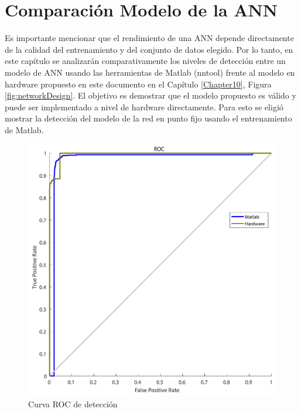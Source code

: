 
\chapter{Comparación Modelo de la ANN} %
\label{Chapter13}


Es importante mencionar que el rendimiento de una ANN depende directamente de la calidad del entrenamiento y del conjunto de datos elegido. Por lo tanto, en este capítulo se analizarán comparativamente los niveles de detección entre un modelo de ANN usando las herramientas de Matlab (nntool) frente al modelo en hardware propuesto en este documento en el Capítulo \ref{Chapter10}, Figura \ref{fig:networkDesign}. El objetivo es demostrar que el modelo propuesto es válido y puede ser implementado a nivel de hardware directamente. Para esto se eligió mostrar la detección del modelo de la red en punto fijo usando el entrenamiento de Matlab.

\begin{figure}[!ht]
	\centering
		\includegraphics[scale=0.35]{./Figures/ROCANN}
	\caption{Curva ROC de detección}
	\label{fig:ROC}
\end{figure}

